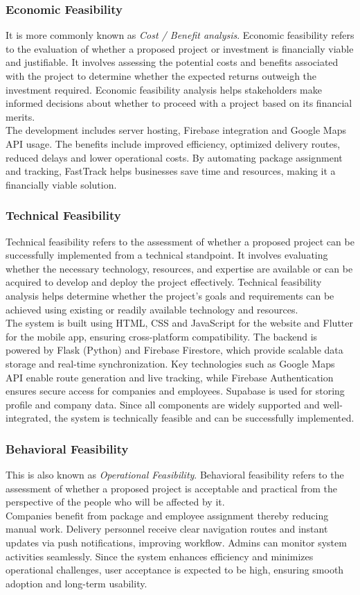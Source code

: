 \subsubsection{Economic Feasibility}
It is more commonly known as \textit{Cost / Benefit analysis}.
Economic feasibility refers to the evaluation of whether a proposed project or investment is financially viable and justifiable. It involves assessing the potential costs and benefits associated with the project to determine whether the expected returns outweigh the investment required. Economic
feasibility analysis helps stakeholders make informed decisions about whether to proceed with a project based on its financial merits.\\
The development includes server hosting, Firebase integration and Google Maps API usage. The benefits include improved efficiency, optimized delivery routes, reduced delays and lower operational costs. By automating package assignment and tracking, FastTrack helps businesses save time and resources, making it a financially viable solution.
\subsubsection{Technical Feasibility}
Technical feasibility refers to the assessment of whether a proposed project can be successfully implemented from a technical standpoint. It involves evaluating whether the necessary technology, resources, and expertise are available or can be acquired to develop and deploy the project effectively. Technical feasibility analysis helps determine whether the project’s goals and requirements can be achieved using existing or readily
available technology and resources. \\
The system is built using HTML, CSS and JavaScript for the website and Flutter for the mobile app, ensuring cross-platform compatibility. The backend is powered by Flask (Python) and Firebase Firestore, which provide scalable data storage and real-time synchronization. Key technologies such as Google Maps API enable route generation and live tracking, while Firebase Authentication ensures secure access for companies and employees. Supabase is used for storing profile and company data. Since all components are widely supported and well-integrated, the system is technically feasible and can be successfully implemented.
\subsubsection{Behavioral Feasibility}
This is also known as \textit{Operational Feasibility}. Behavioral feasibility refers to the assessment of whether a proposed project is acceptable and practical from the perspective of the
people who will be affected by it. \\
Companies benefit from package and employee assignment thereby reducing manual work. Delivery personnel receive clear navigation routes and instant updates via push notifications, improving workflow. Admins can monitor system activities seamlessly. Since the system enhances efficiency and minimizes operational challenges, user acceptance is expected to be high, ensuring smooth adoption and long-term usability.

